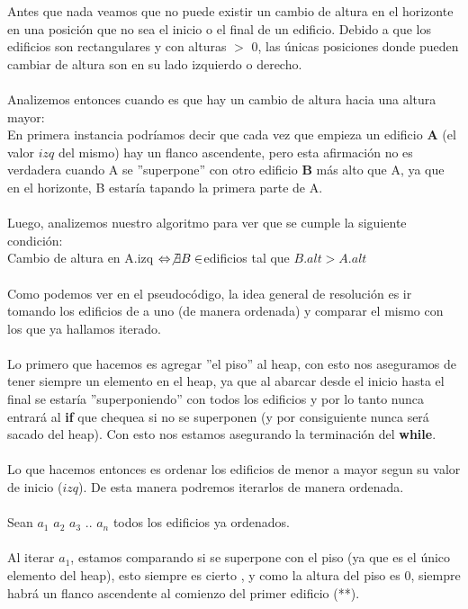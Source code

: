 Antes que nada veamos que no puede existir un cambio de altura en el horizonte en una posici\'on que no sea el inicio o el final de un edificio. Debido a que los edificios son rectangulares y con alturas $>$ 0, las únicas posiciones donde pueden cambiar de altura son en su lado izquierdo o derecho.
\\
\\
Analizemos entonces cuando es que hay un cambio de altura hacia una altura mayor:
\\
En primera instancia podr\'iamos decir que cada vez que empieza un edificio \textbf{A} (el valor $izq$ del mismo) hay un flanco ascendente, pero esta afirmaci\'on no es verdadera cuando A se ''superpone'' con otro edificio \textbf{B} m\'as alto que A, ya que en el horizonte, B estar\'ia tapando la primera parte de A. 
\\
\\
Luego, analizemos nuestro algoritmo para ver que se cumple la siguiente condici\'on:
\\
Cambio de altura en A.izq $ \Leftrightarrow \not \exists B \in $edificios tal que $B.alt > A.alt$
\\
\\
Como podemos ver en el pseudoc\'odigo, la idea general de resoluci\'on es ir tomando los edificios de a uno (de manera ordenada) y comparar el mismo con los que ya hallamos iterado.
\\
\\
Lo primero que hacemos es agregar ''el piso'' al heap, con esto nos aseguramos de tener siempre un elemento en el heap, ya que al abarcar desde el inicio hasta el final se estar\'ia ''superponiendo'' con todos los edificios y por lo tanto nunca entrar\'a al \textbf{if} que chequea si no se superponen (y por consiguiente nunca ser\'a sacado del heap). Con esto nos estamos asegurando la terminaci\'on del \textbf{while}.
\\
\\
Lo que hacemos entonces es ordenar los edificios de menor a mayor segun su valor de inicio ($izq$). De esta manera podremos iterarlos de manera ordenada.
\\
\\ 
Sean $a_1$ $a_2$ $a_3$ .. $a_n$ todos los edificios ya ordenados.
\\
\\
Al iterar $a_1$, estamos comparando si se superpone con el piso (ya que es el \'unico elemento del heap), esto siempre es cierto , y como la altura del piso es 0, siempre habr\'a un flanco ascendente al comienzo del primer edificio (**).
\\
\\

